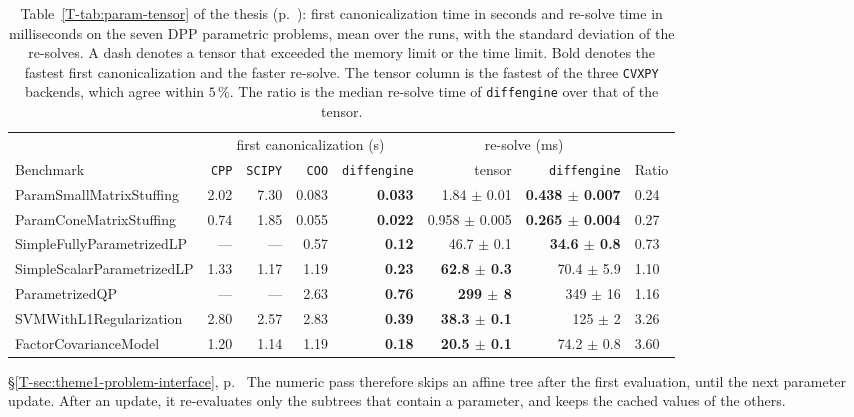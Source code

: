 \documentclass[letterpaper,12pt]{article}
\newcommand{\ac}[1]{#1}
\newcommand{\tsec}[1]{\S\ref{T-#1}}
\newcommand{\tpage}[1]{p.~\pageref{T-#1}}
\newcommand{\tref}[1]{\tsec{#1}, \tpage{#1}}
\begin{document}
\begin{table}[htbp]
\centering
\caption{Table~\ref{T-tab:param-tensor} of the thesis (\tpage{tab:param-tensor}): first
canonicalization time in seconds and re-solve time in milliseconds on the seven \ac{DPP}
parametric problems, mean over the runs, with the standard deviation of the re-solves. A dash denotes a tensor that exceeded the
memory limit or the time limit. Bold denotes the fastest first canonicalization and the
faster re-solve. The tensor column is the fastest of the three \texttt{CVXPY} backends, which agree within
$5\,\%$. The
ratio is the median re-solve time of \texttt{diffengine} over that of the tensor.}
\label{tab:res-param}
{\footnotesize
\setlength{\tabcolsep}{3pt}
\begin{tabular}{l rrrr rr l}
\toprule
& \multicolumn{4}{c}{first canonicalization (s)} & \multicolumn{2}{c}{re-solve (ms)} & \\
\cmidrule(lr){2-5}\cmidrule(lr){6-7}
Benchmark & \texttt{CPP} & \texttt{SCIPY} & \texttt{COO} & \texttt{diffengine}
& tensor & \texttt{diffengine} & Ratio \\
\midrule
ParamSmallMatrixStuffing    & 2.02 & 7.30 & 0.083 & \textbf{0.033} & 1.84 $\pm$ 0.01 & \textbf{0.438 $\pm$ 0.007} & 0.24 \\
ParamConeMatrixStuffing     & 0.74 & 1.85 & 0.055 & \textbf{0.022} & 0.958 $\pm$ 0.005 & \textbf{0.265 $\pm$ 0.004} & 0.27 \\
SimpleFullyParametrizedLP   & --- & --- & 0.57 & \textbf{0.12} & 46.7 $\pm$ 0.1 & \textbf{34.6 $\pm$ 0.8} & 0.73 \\
SimpleScalarParametrizedLP  & 1.33 & 1.17 & 1.19 & \textbf{0.23} & \textbf{62.8 $\pm$ 0.3} & 70.4 $\pm$ 5.9 & 1.10 \\
ParametrizedQP              & --- & --- & 2.63 & \textbf{0.76} & \textbf{299 $\pm$ 8} & 349 $\pm$ 16 & 1.16 \\
SVMWithL1Regularization     & 2.80 & 2.57 & 2.83 & \textbf{0.39} & \textbf{38.3 $\pm$ 0.1} & 125 $\pm$ 2 & 3.26 \\
FactorCovarianceModel       & 1.20 & 1.14 & 1.19 & \textbf{0.18} & \textbf{20.5 $\pm$ 0.1} & 74.2 $\pm$ 0.8 & 3.60 \\
\bottomrule
\end{tabular}}
\end{table}

\begin{thesisquote}{\tref{sec:theme1-problem-interface}}
The numeric pass therefore skips an affine tree after the first evaluation, until the next
parameter update. After an update, it re-evaluates only the subtrees that contain a parameter,
and keeps the cached values of the others.
\end{thesisquote}
\end{document}
